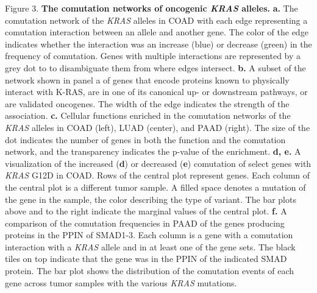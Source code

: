 \documentclass[english, 10pt, letterpaper]{article}
\newcommand{\KRAS}{\emph{KRAS}}
\newcommand{\kras}{K-RAS}
\begin{document}
{
    \noindent Figure 3. \textbf{The comutation networks of oncogenic \KRAS{} alleles.}
    \textbf{a.} The comutation network of the \KRAS{} alleles in COAD with each edge representing a comutation interaction between an allele and another gene. The color of the edge indicates whether the interaction was an increase (blue) or decrease (green) in the frequency of comutation. Genes with multiple interactions are represented by a grey dot to to disambiguate them from where edges intersect.
    \textbf{b.} A subset of the network shown in panel a of genes that encode proteins known to physically interact with \kras{}, are in one of its canonical up- or downstream pathways, or are validated oncogenes. The width of the edge indicates the strength of the association.
    \textbf{c.} Cellular functions enriched in the comutation networks of the \KRAS{} alleles in COAD (left), LUAD (center), and PAAD (right). The size of the dot indicates the number of genes in both the function and the comutation network, and the transparency indicates the p-value of the enrichment.
    \textbf{d, e.} A visualization of the increased (\textbf{d}) or decreased (\textbf{e}) comutation of select genes with \KRAS{} G12D in COAD. Rows of the central plot represent genes. Each column of the central plot is a different tumor sample. A filled space denotes a mutation of the gene in the sample, the color describing the type of variant. The bar plots above and to the right indicate the marginal values of the central plot.
    \textbf{f.} A comparison of the comutation frequencies in PAAD of the genes producing proteins in the PPIN of SMAD1-3. Each column is a gene with a comutation interaction with a \KRAS{} allele and in at least one of the gene sets. The black tiles on top indicate that the gene was in the PPIN of the indicated SMAD protein. The bar plot shows the distribution of the comutation events of each gene across tumor samples with the various \KRAS{} mutations.\par
}
\newpage
\end{document}
